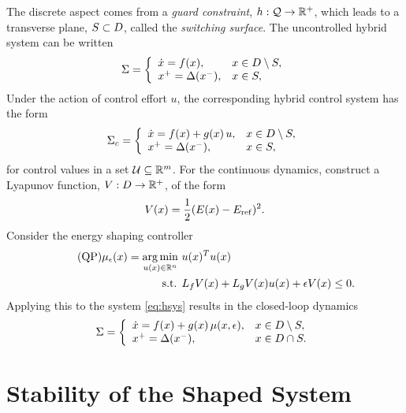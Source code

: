 \documentclass[twocolumn]{article}
\begin{document}
The discrete aspect comes from a {\em guard constraint}, $h : \mathcal{Q} \to \mathbb{R}^{+}$, which leads to a transverse plane, $S \subset D$, called the {\em switching surface}.
%
The uncontrolled hybrid system can be written
\begin{align}
  \Sigma = \left\{
  \begin{array}{l l}
    {\dot x} = f(x), & x \in D \setminus S,\\
    x^{+} = \Delta(x^{-}), &x \in S,
  \end{array}\right.
  \label{eq:hsys}
\end{align}
Under the action of control effort $u$, the corresponding hybrid control system has the form
\begin{align}
  \Sigma_{c} = \left\{
  \begin{array}{l l}
    {\dot x} = f(x) + g(x) \, u, & x \in D \setminus S,\\
    x^{+} = \Delta(x^{-}), &x \in S,
  \end{array}\right.
  \label{eq:csys}
\end{align}
for control values in a set $\mathcal{U} \subseteq \mathbb{R}^{m}$.
%
For the continuous dynamics, construct a Lyapunov function, $V : D \to \mathbb{R}^{+}$, of the form
\begin{align}
  \label{eq:lyap}
  V(x) = \frac{1}{2} (E(x) - E_{\mathrm{ref}})^2.
\end{align}
Consider the energy shaping controller
\begin{align}
  \label{eq:es-qp} \tag {QP}
  \mu_{\epsilon}(x) = \operatorname*{arg\,min}_{u(x) \in \mathbb{R}^{n}} \ & u(x)^T u(x)\\
  \nonumber
  \mbox{s.t. } & L_{f} V(x) + L_{g} V(x) u(x) + \epsilon V(x) \leq 0.
\end{align}
Applying this to the system \eqref{eq:hsys} results in the closed-loop dynamics
\begin{align}
  \label{eq:hsys-cl}
  \Sigma = \left\{
  \begin{array}{l l}
    {\dot x} = f(x) + g(x) \, \mu(x, \epsilon), & x \in D \setminus S,\\
    x^{+} = \Delta(x^{-}), &x \in D \cap S.
  \end{array}\right.
\end{align}



\section{Stability of the Shaped System}
\end{document}
